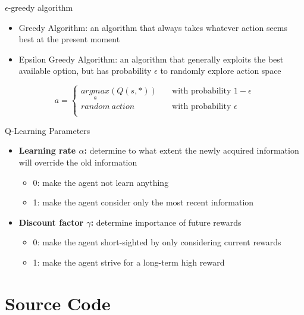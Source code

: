 \documentclass{beamer}
\begin{document}
\begin{frame}{$\epsilon$-greedy algorithm}
\begin{itemize}
\item{Greedy Algorithm: an algorithm that always takes whatever action seems best at the present moment}
\item{Epsilon Greedy Algorithm: an algorithm that generally exploits the best available option, but has probability $\epsilon$ to randomly explore action space}
\end{itemize}

\[ a = 
  \begin{cases}
  \underset{a}{argmax}(Q(s,*)) & \quad \text{with probability } 1 - \epsilon \\
  random\ action & \quad \text{with probability } \epsilon \\
  \end{cases}
\]
\end{frame}


\begin{frame}{Q-Learning Parameters}
\begin{itemize}
\item{\textbf{Learning rate $\alpha$:} determine to what extent the newly acquired information will override the old information}
\begin{itemize}
\item{0: make the agent not learn anything}
\item{1: make the agent consider only the most recent information}
\end{itemize}
\item{\textbf{Discount factor $\gamma$:} determine importance of future rewards}
\begin{itemize}
\item{0: make the agent short-sighted by only considering current rewards}
\item{1: make the agent strive for a long-term high reward}
\end{itemize}
\end{itemize}
\end{frame}

\section{Source Code}
\end{document}
